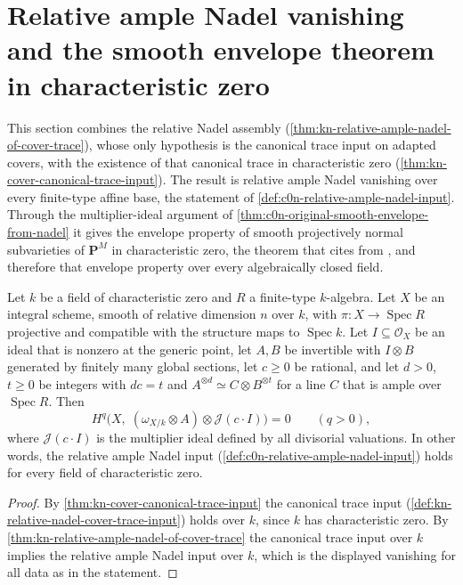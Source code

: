 \section{Relative ample Nadel vanishing and the smooth envelope theorem in characteristic zero}
\label{sec:kn-relative-nadel-vanishing}

This section combines the relative Nadel assembly
(\cref{thm:kn-relative-ample-nadel-of-cover-trace}), whose only hypothesis is the
canonical trace input on adapted covers, with the existence of that canonical
trace in characteristic zero (\cref{thm:kn-cover-canonical-trace-input}). The
result is relative ample Nadel vanishing over every finite-type affine base,
the statement of \cref{def:c0n-relative-ample-nadel-input}. Through the
multiplier-ideal argument of \cref{thm:c0n-original-smooth-envelope-from-nadel}
it gives the envelope property of smooth projectively normal subvarieties of
$\mathbf P^M$ in characteristic zero, the theorem that \cite[\S3]{FHX} cites
from \cite[Theorem~5.20]{BJ22}, and therefore that envelope property over every
algebraically closed field.

\begin{theorem}
\label{thm:kn-relative-ample-nadel-vanishing}
\leanok
Let $k$ be a field of characteristic zero and $R$ a finite-type $k$-algebra.
Let $X$ be an integral scheme, smooth of relative dimension $n$ over $k$, with
$\pi:X\to\operatorname{Spec}R$ projective and compatible with the structure maps
to $\operatorname{Spec}k$. Let $I\subseteq\mathcal O_X$ be an ideal that is
nonzero at the generic point, let $A,B$ be invertible with $I\otimes B$
generated by finitely many global sections, let $c\geq0$ be rational, and let
$d>0$, $t\geq0$ be integers with $dc=t$ and
$A^{\otimes d}\simeq C\otimes B^{\otimes t}$ for a line $C$ that is ample over
$\operatorname{Spec}R$. Then
\[
 H^{q}\bigl(X,\;(\omega_{X/k}\otimes A)\otimes\mathcal J(c\cdot I)\bigr)=0
 \qquad(q>0),
\]
where $\mathcal J(c\cdot I)$ is the multiplier ideal defined by all divisorial
valuations. In other words, the relative ample Nadel input
(\cref{def:c0n-relative-ample-nadel-input}) holds for every field of
characteristic zero.
\end{theorem}
\begin{proof}
By \cref{thm:kn-cover-canonical-trace-input} the canonical trace input
(\cref{def:kn-relative-nadel-cover-trace-input}) holds over $k$, since $k$ has
characteristic zero. By \cref{thm:kn-relative-ample-nadel-of-cover-trace} the
canonical trace input over $k$ implies the relative ample Nadel input over $k$,
which is the displayed vanishing for all data as in the statement.
\end{proof}

